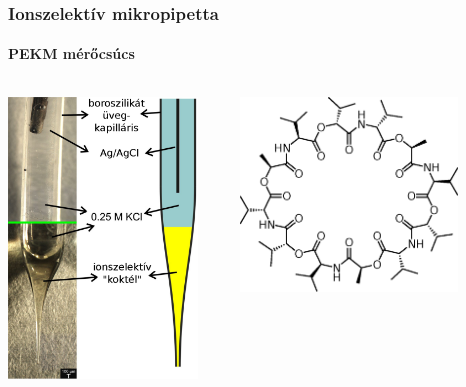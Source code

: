 \documentclass{beamer}
\begin{document}
\begin{frame}
\frametitle{Ionszelektív mikropipetta}
\framesubtitle{PEKM mérőcsúcs}
\begin{columns}[T] %
\begin{column}{.48\textwidth}

\centering
\includegraphics[width=0.9\textwidth]{liquid.eps}
\end{column}%
\hfill%
\begin{column}{.48\textwidth}
\centering

\includegraphics[width=0.8\textwidth]{Valinomycin.eps}


\end{column}
\end{columns}
\end{frame}
\end{document}
